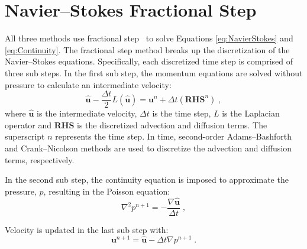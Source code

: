 \documentclass[onehalf,11pt]{beavtex}
\begin{document}
\section{Navier--Stokes Fractional Step}\label{NM:NavierStokes}
All three methods use fractional step~\cite{Perot1993} to solve Equations \eqref{eq:NavierStokes} and \eqref{eq:Continuity}. 
The fractional step method breaks up the discretization of the Navier--Stokes equations. 
Specifically, each discretized time step is comprised of three sub steps.
In the first sub step, the momentum equations are solved without pressure to  calculate an intermediate velocity:
\begin{equation}\label{eq:Intermediate Velocity}
\hat{\textbf{u}} - \frac{\Delta t}{2}L(\hat{\textbf{u}}) = \textbf{u}^n + \Delta t(\textbf{RHS}^n) \;,
\end{equation}
where $\hat{\textbf{u}}$ is the intermediate velocity, $\Delta t$ is the time step, $L$ is the Laplacian operator and $\textbf{RHS}$ is the discretized advection and diffusion terms. 
The superscript $n$ represents the time step. 
In time, second-order Adams--Bashforth and Crank--Nicolson methods are used to discretize the advection and diffusion terms, respectively. 

In the second sub step, the continuity equation is imposed to approximate the pressure, $p$, resulting in the Poisson equation:
\begin{equation}\label{eq:Poisson}
\nabla^2p^{n+1} = - \frac{\nabla\hat{\textbf{u}}}{\Delta t} \;,
\end{equation}

Velocity is updated in the last sub step with:
\begin{equation}\label{eq:Projection}
\textbf{u}^{n+1} = \hat{\textbf{u}} - \Delta t\nabla p^{n+1} \;.
\end{equation}
\end{document}
